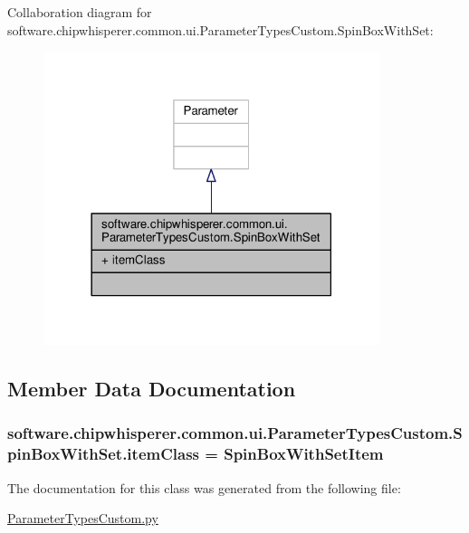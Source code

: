 Collaboration diagram for software.\+chipwhisperer.\+common.\+ui.\+Parameter\+Types\+Custom.\+Spin\+Box\+With\+Set\+:\nopagebreak
\begin{figure}[H]
\begin{center}
\leavevmode
\includegraphics[width=278pt]{d4/d5f/classsoftware_1_1chipwhisperer_1_1common_1_1ui_1_1ParameterTypesCustom_1_1SpinBoxWithSet__coll__graph}
\end{center}
\end{figure}


\subsection{Member Data Documentation}
\hypertarget{classsoftware_1_1chipwhisperer_1_1common_1_1ui_1_1ParameterTypesCustom_1_1SpinBoxWithSet_ac165e34ee797e08789f0232c115e02c6}{}
\subsubsection[{item\+Class}]{\setlength{\rightskip}{0pt plus 5cm}software.\+chipwhisperer.\+common.\+ui.\+Parameter\+Types\+Custom.\+Spin\+Box\+With\+Set.\+item\+Class = {\bf Spin\+Box\+With\+Set\+Item}\hspace{0.3cm}{\ttfamily [static]}}\label{classsoftware_1_1chipwhisperer_1_1common_1_1ui_1_1ParameterTypesCustom_1_1SpinBoxWithSet_ac165e34ee797e08789f0232c115e02c6}


The documentation for this class was generated from the following file\+:\begin{DoxyCompactItemize}
\item 
\hyperlink{ParameterTypesCustom_8py}{Parameter\+Types\+Custom.\+py}\end{DoxyCompactItemize}
